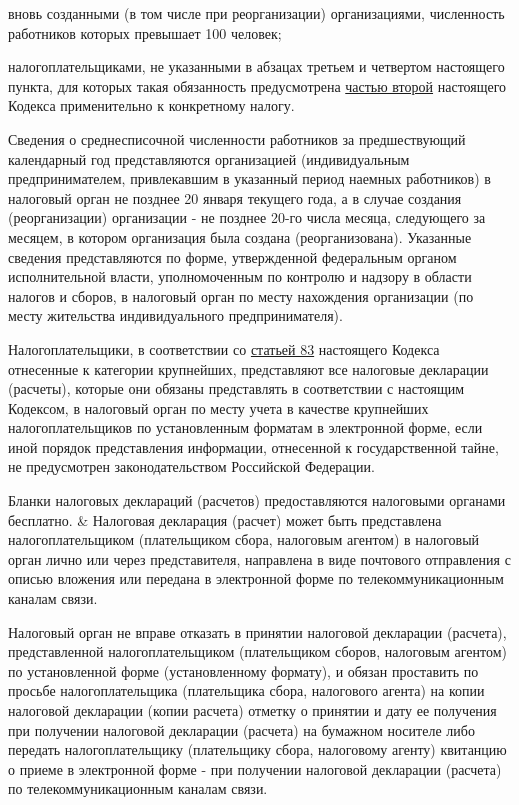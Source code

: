 \documentclass[a4page]{report}
\begin{document}
\par вновь созданными (в том числе при реорганизации) организациями, численность работников которых превышает 100 человек;
\par налогоплательщиками, не указанными в абзацах третьем и четвертом настоящего пункта, для которых такая обязанность предусмотрена \uline{частью второй} настоящего Кодекса применительно к конкретному налогу.
\par Сведения о среднесписочной численности работников за предшествующий календарный год представляются организацией (индивидуальным предпринимателем, привлекавшим в указанный период наемных работников) в налоговый орган не позднее 20 января текущего года, а в случае создания (реорганизации) организации - не позднее 20-го числа месяца, следующего за месяцем, в котором организация была создана (реорганизована). Указанные сведения представляются по форме, утвержденной федеральным органом исполнительной власти, уполномоченным по контролю и надзору в области налогов и сборов, в налоговый орган по месту нахождения организации (по месту жительства индивидуального предпринимателя).
\par Налогоплательщики, в соответствии со \uline{статьей 83} настоящего Кодекса отнесенные к категории крупнейших, представляют все налоговые декларации (расчеты), которые они обязаны представлять в соответствии с настоящим Кодексом, в налоговый орган по месту учета в качестве крупнейших налогоплательщиков по установленным форматам в электронной форме, если иной порядок представления информации, отнесенной к государственной тайне, не предусмотрен законодательством Российской Федерации.
\par Бланки налоговых деклараций (расчетов) предоставляются налоговыми органами бесплатно.
& Налоговая декларация (расчет) может быть представлена налогоплательщиком (плательщиком сбора, налоговым агентом) в налоговый орган лично или через представителя, направлена в виде почтового отправления с описью вложения или передана в электронной форме по телекоммуникационным каналам связи.
\par Налоговый орган не вправе отказать в принятии налоговой декларации (расчета), представленной налогоплательщиком (плательщиком сборов, налоговым агентом) по установленной форме (установленному формату), и обязан проставить по просьбе налогоплательщика (плательщика сбора, налогового агента) на копии налоговой декларации (копии расчета) отметку о принятии и дату ее получения при получении налоговой декларации (расчета) на бумажном носителе либо передать налогоплательщику (плательщику сбора, налоговому агенту) квитанцию о приеме в электронной форме - при получении налоговой декларации (расчета) по телекоммуникационным каналам связи.
\end{document}

